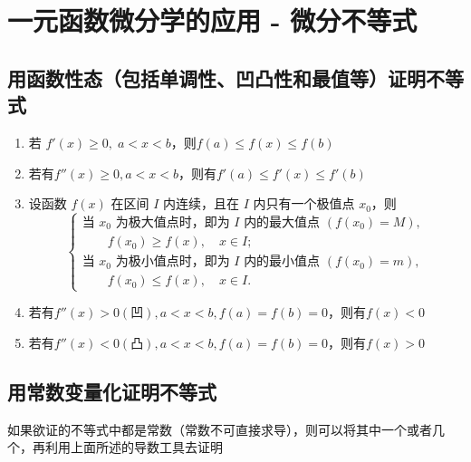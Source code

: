 \documentclass[a4paper,12pt]{article}
\begin{document}
    \section{一元函数微分学的应用 - 微分不等式}

    \subsection{用函数性态（包括单调性、凹凸性和最值等）证明不等式}

    \begin{enumerate}
        \item 若 $f'(x)\ge 0,\; a<x<b$，则$f(a)\leq f(x)\leq f(b)$
        \item 若有$f''(x) \geq 0, a < x < b$，则有$f'(a) \leq f'(x) \leq f'(b)$
        \item 设函数 $f(x)$ 在区间 $I$ 内连续，且在 $I$ 内只有一个极值点 $x_0$，则
        \[
            \begin{cases}
                \text{当 } x_0 \text{ 为极大值点时，即为 } I \text{ 内的最大值点 } (f(x_0)=M), \\
                \qquad f(x_0)\ge f(x), \quad x\in I; \\[6pt]
                \text{当 } x_0 \text{ 为极小值点时，即为 } I \text{ 内的最小值点 } (f(x_0)=m), \\
                \qquad f(x_0)\le f(x), \quad x\in I.
            \end{cases}
        \]
        \item 若有$f''(x) > 0(\text{凹}), a < x < b, f(a) = f(b) = 0$，则有$f(x) < 0$
        \item 若有$f''(x) < 0(\text{凸}), a < x < b, f(a) = f(b) = 0$，则有$f(x) > 0$
    \end{enumerate}

    \subsection{用常数变量化证明不等式}

    如果欲证的不等式中都是常数（常数不可直接求导），则可以将其中一个或者几个{\color{red}{常数变量化}}，再利用上面所述的导数工具去证明
\end{document}
